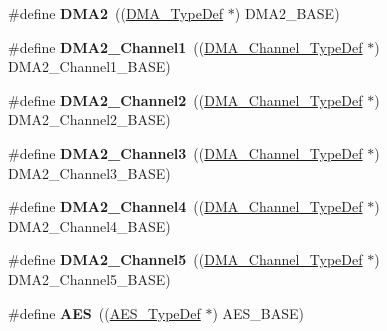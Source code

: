 \begin{DoxyCompactItemize}
\item 
\hypertarget{group___peripheral__declaration_ga506520140eec1708bc7570c49bdf972d}{\#define {\bfseries D\-M\-A2}~((\hyperlink{struct_d_m_a___type_def}{D\-M\-A\-\_\-\-Type\-Def} $\ast$) D\-M\-A2\-\_\-\-B\-A\-S\-E)}\label{group___peripheral__declaration_ga506520140eec1708bc7570c49bdf972d}

\item 
\hypertarget{group___peripheral__declaration_gad86c75e1ff89e03e15570f47962865c8}{\#define {\bfseries D\-M\-A2\-\_\-\-Channel1}~((\hyperlink{struct_d_m_a___channel___type_def}{D\-M\-A\-\_\-\-Channel\-\_\-\-Type\-Def} $\ast$) D\-M\-A2\-\_\-\-Channel1\-\_\-\-B\-A\-S\-E)}\label{group___peripheral__declaration_gad86c75e1ff89e03e15570f47962865c8}

\item 
\hypertarget{group___peripheral__declaration_ga316024020799373b9d8e35c316c74f24}{\#define {\bfseries D\-M\-A2\-\_\-\-Channel2}~((\hyperlink{struct_d_m_a___channel___type_def}{D\-M\-A\-\_\-\-Channel\-\_\-\-Type\-Def} $\ast$) D\-M\-A2\-\_\-\-Channel2\-\_\-\-B\-A\-S\-E)}\label{group___peripheral__declaration_ga316024020799373b9d8e35c316c74f24}

\item 
\hypertarget{group___peripheral__declaration_ga6dca52a79587e0ca9a5d669048b4c7eb}{\#define {\bfseries D\-M\-A2\-\_\-\-Channel3}~((\hyperlink{struct_d_m_a___channel___type_def}{D\-M\-A\-\_\-\-Channel\-\_\-\-Type\-Def} $\ast$) D\-M\-A2\-\_\-\-Channel3\-\_\-\-B\-A\-S\-E)}\label{group___peripheral__declaration_ga6dca52a79587e0ca9a5d669048b4c7eb}

\item 
\hypertarget{group___peripheral__declaration_ga612b396657695191ad740b0b59bc9f12}{\#define {\bfseries D\-M\-A2\-\_\-\-Channel4}~((\hyperlink{struct_d_m_a___channel___type_def}{D\-M\-A\-\_\-\-Channel\-\_\-\-Type\-Def} $\ast$) D\-M\-A2\-\_\-\-Channel4\-\_\-\-B\-A\-S\-E)}\label{group___peripheral__declaration_ga612b396657695191ad740b0b59bc9f12}

\item 
\hypertarget{group___peripheral__declaration_ga521c13b7d0f82a6897d47995da392750}{\#define {\bfseries D\-M\-A2\-\_\-\-Channel5}~((\hyperlink{struct_d_m_a___channel___type_def}{D\-M\-A\-\_\-\-Channel\-\_\-\-Type\-Def} $\ast$) D\-M\-A2\-\_\-\-Channel5\-\_\-\-B\-A\-S\-E)}\label{group___peripheral__declaration_ga521c13b7d0f82a6897d47995da392750}

\item 
\hypertarget{group___peripheral__declaration_ga5412ac9ff64f4ab68c289a0da739eaef}{\#define {\bfseries A\-E\-S}~((\hyperlink{struct_a_e_s___type_def}{A\-E\-S\-\_\-\-Type\-Def} $\ast$) A\-E\-S\-\_\-\-B\-A\-S\-E)}\label{group___peripheral__declaration_ga5412ac9ff64f4ab68c289a0da739eaef}


\end{DoxyCompactItemize}
